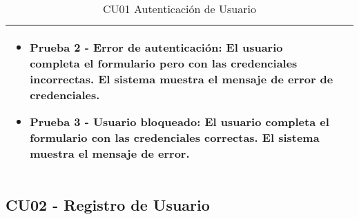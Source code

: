 \begin{table}[H]
\begin{tabularx}{\linewidth}{ p{} p{} }
\begin{itemize}
			\item \textbf{Prueba 2 - Error de autenticación}: El usuario completa el formulario pero con las credenciales incorrectas. El sistema muestra el mensaje de error de credenciales.
			\item \textbf{Prueba 3 - Usuario bloqueado}: El usuario completa el formulario con las credenciales correctas. El sistema muestra el mensaje de error.
		\end{itemize} \\
		\bottomrule
	\end{tabularx}
	\caption{CU01 Autenticación de Usuario}
	\label{cu:autenticacion-usuario}
\end{table}

\subsection{CU02 - Registro de Usuario}

